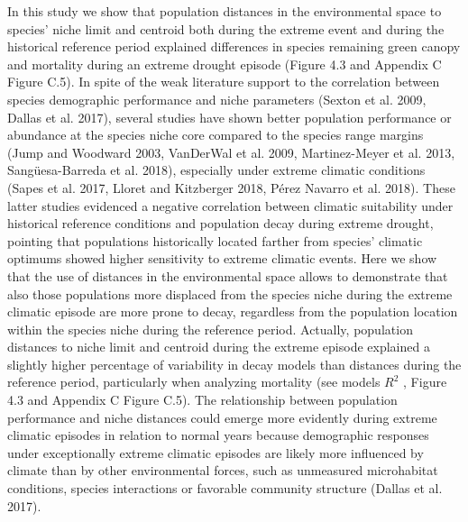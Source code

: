\documentclass[11pt,twoside]{reedthesis}
\begin{document}
In this study we show that population distances in the environmental
space to species' niche limit and centroid both during the extreme event
and during the historical reference period explained differences in
species remaining green canopy and mortality during an extreme drought
episode (Figure 4.3 and Appendix C Figure C.5). In spite of the weak
literature support to the correlation between species demographic
performance and niche parameters (Sexton et al. 2009, Dallas et al.
2017), several studies have shown better population performance or
abundance at the species niche core compared to the species range
margins (Jump and Woodward 2003, VanDerWal et al. 2009, Martinez-Meyer
et al. 2013, Sangüesa-Barreda et al. 2018), especially under extreme
climatic conditions (Sapes et al. 2017, Lloret and Kitzberger 2018,
Pérez Navarro et al. 2018). These latter studies evidenced a negative
correlation between climatic suitability under historical reference
conditions and population decay during extreme drought, pointing that
populations historically located farther from species' climatic optimums
showed higher sensitivity to extreme climatic events. Here we show that
the use of distances in the environmental space allows to demonstrate
that also those populations more displaced from the species niche during
the extreme climatic episode are more prone to decay, regardless from
the population location within the species niche during the reference
period. Actually, population distances to niche limit and centroid
during the extreme episode explained a slightly higher percentage of
variability in decay models than distances during the reference period,
particularly when analyzing mortality (see models \(R^2\) , Figure 4.3
and Appendix C Figure C.5). The relationship between population
performance and niche distances could emerge more evidently during
extreme climatic episodes in relation to normal years because
demographic responses under exceptionally extreme climatic episodes are
likely more influenced by climate than by other environmental forces,
such as unmeasured microhabitat conditions, species interactions or
favorable community structure (Dallas et al. 2017). \par
\end{document}
